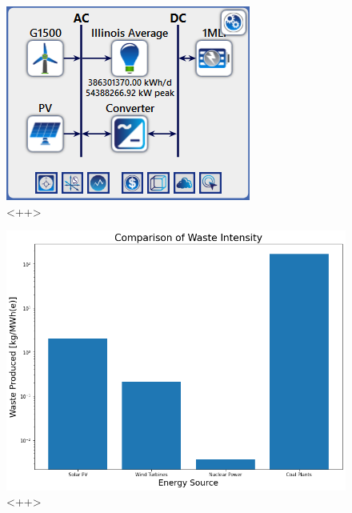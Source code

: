 \begin{figure}[ht]
	\centering
	\includegraphics[width=\columnwidth]{./img/homer_system_setup.png}
	\caption{<++>}
	\label{fig:bau}
\end{figure}


\begin{figure}[ht]
	\centering
	\includegraphics[width=\columnwidth]{./img/mass-waste-intensity.png}
	\caption{<++>}
	\label{fig:bau}
\end{figure}


